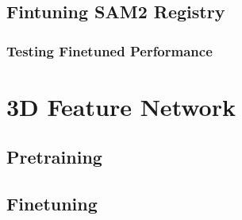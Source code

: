 \subsection{Fintuning SAM2 Registry}

\subsubsection{Testing Finetuned Performance}

\section{3D Feature Network}

\subsection{Pretraining}

\subsection{Finetuning}
